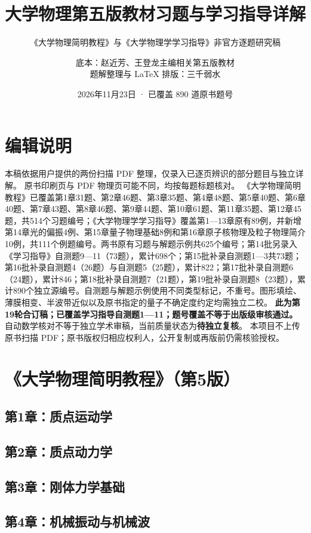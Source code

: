 \documentclass[lang=cn,color=blue,11pt]{elegantbook}
\title{大学物理第五版教材习题与学习指导详解}
\subtitle{《大学物理简明教程》与《大学物理学学习指导》\quad 非官方逐题研究稿}
\author{底本：赵近芳、王登龙主编相关第五版教材\\题解整理与 LaTeX 排版：三千弱水}
\date{2026年11月23日 · 已覆盖 890 道原书题号}
\begin{document}
\maketitle
\frontmatter
\chapter*{编辑说明}
本稿依据用户提供的两份扫描 PDF 整理，仅录入已逐页辨识的部分题目与独立详解。
原书印刷页与 PDF 物理页可能不同，均按每题标题核对。
《大学物理简明教程》已覆盖第1章31题、第2章46题、第3章35题、第4章48题、第5章40题、第6章40题、第7章43题、第8章46题、第9章44题、第10章61题、第11章35题、第12章45题，共514个习题编号；《大学物理学学习指导》覆盖第1—13章原有89例，并新增第14章光的偏振4例、第15章量子物理基础8例和第16章原子核物理及粒子物理简介10例，共111个例题编号。两书原有习题与解题示例共625个编号；第14批另录入《学习指导》自测题9—11（73题），累计698个；第15批补录自测题1—3共73题；第16批补录自测题4（26题）与自测题5（25题），累计822；第17批补录自测题6（24题），累计846；第18批补录自测题7（21题），第19批补录自测题8（23题），累计890个独立源编号。自测题与解题示例使用不同类型标记，不重号。图形填绘、薄膜相变、半波带近似以及原书指定的量子不确定度约定均需独立二校。
\textbf{此为第19轮合订稿；已覆盖学习指导自测题1—11；题号覆盖不等于出版级审核通过。}
自动数学核对不等于独立学术审稿，当前质量状态为\textbf{待独立复核}。
本项目不上传原书扫描 PDF；原书版权归相应权利人，公开复制或再版前仍需核验授权。
\tableofcontents
\mainmatter
\chapter{《大学物理简明教程》（第5版）}
\section{第1章：质点运动学}


\section{第2章：质点动力学}




\section{第3章：刚体力学基础}




\section{第4章：机械振动与机械波}

\end{document}

